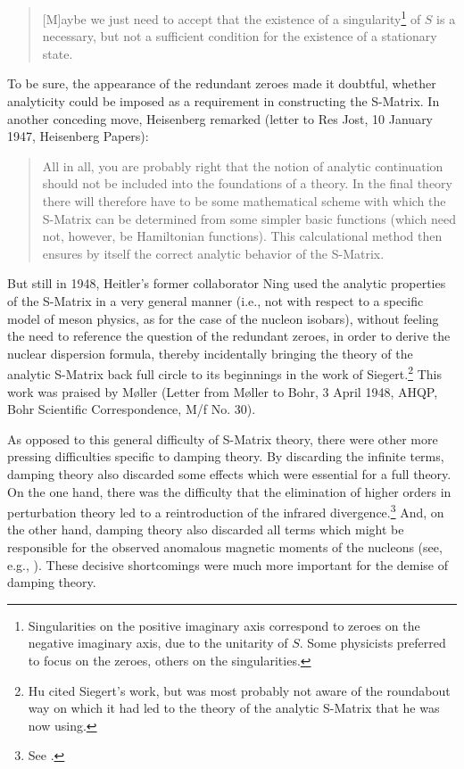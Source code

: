 \documentclass[12pt,a4paper]{article}
\begin{document}
\begin{quote}
[M]aybe we just need to accept that the existence of a singularity\footnote{Singularities on the positive imaginary axis correspond to zeroes on the negative imaginary axis, due to the unitarity of $S$. Some physicists preferred to focus on the zeroes, others on the singularities.} of $S$ is a necessary, but not a sufficient condition for the existence of a stationary state.
\end{quote}

To be sure, the appearance of the redundant zeroes made it doubtful, whether analyticity could be imposed as a requirement in constructing the S-Matrix. In another conceding move, Heisenberg remarked (letter to Res Jost, 10 January 1947, Heisenberg Papers):

\begin{quote}
All in all, you are probably right that the notion of analytic continuation should not be included into the foundations of a theory. In the final theory there will therefore have to be some mathematical scheme with which the S-Matrix can be determined from some simpler basic functions (which need not, however, be Hamiltonian functions). This calculational method then ensures by itself the correct analytic behavior of the S-Matrix.
\end{quote}

But still in 1948, Heitler's former collaborator Ning \citet{hu_1948_on-the-application} used the analytic properties of the S-Matrix in a very general manner (i.e., not with respect to a specific model of meson physics, as for the case of the nucleon isobars), without feeling the need to reference the question of the redundant zeroes, in order to derive the nuclear dispersion formula, thereby incidentally bringing the theory of the analytic S-Matrix back full circle to its beginnings in the work of Siegert.\footnote{Hu cited Siegert's work, but was most probably not aware of the roundabout way on which it had led to the theory of the analytic S-Matrix that he was now using.} This work was praised by M\o ller (Letter from M\o ller to Bohr, 3 April 1948, AHQP, Bohr Scientific Correspondence, M/f No. 30).

As opposed to this general difficulty of S-Matrix theory, there were other more pressing difficulties specific to damping theory. By discarding the infinite terms, damping theory also discarded some effects which were essential for a full theory. On the one hand, there was the difficulty that the elimination of higher orders in perturbation theory led to a reintroduction of the infrared divergence.\footnote{See \citep{blum_2015_qed}.} And, on the other hand, damping theory also discarded all terms which might be responsible for the observed anomalous magnetic moments of the nucleons (see, e.g., \citep[p. 194]{heitler_1947_the-quantum}). These decisive shortcomings were much more important for the demise of damping theory.
\end{document}
